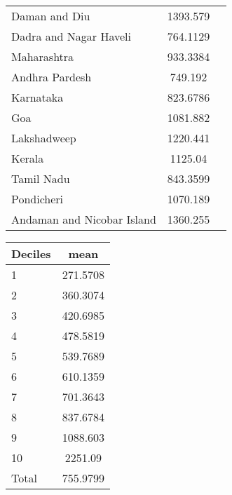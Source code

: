 \documentclass[12pt]{article}
\begin{document}
\begin{table}[htbp]
{\begin{tabular}{l*{1}{cc}}
Daman and Diu                 &              1393.579\\
Dadra and Nagar Haveli        &              764.1129\\
Maharashtra                   &              933.3384\\
Andhra Pardesh                &               749.192\\
Karnataka                     &              823.6786\\
Goa                           &              1081.882\\
Lakshadweep                   &              1220.441\\
Kerala                        &               1125.04\\
Tamil Nadu                    &              843.3599\\
Pondicheri                    &              1070.189\\
Andaman and Nicobar Island    &              1360.255\\
\hline\hline
\end{tabular}
}

\end{table}


\begin{table}[htbp]\centering
{
\def\sym#1{\ifmmode^{#1}\else\(^{#1}\)\fi}
\begin{tabular}{l*{1}{c}}
\hline\hline
Deciles &        mean\\
\hline
1                             &    271.5708\\
2                             &    360.3074\\
3                             &    420.6985\\
4                             &    478.5819\\
5                             &    539.7689\\
6                             &    610.1359\\
7                             &    701.3643\\
8                             &    837.6784\\
9                             &    1088.603\\
10                            &     2251.09\\
\hline
Total                         &    755.9799\\
\hline\hline
\end{tabular}
}

\end{table}
\end{document}
